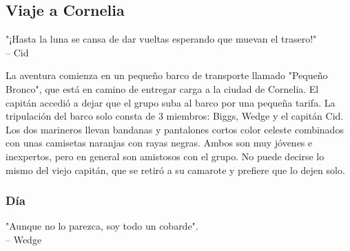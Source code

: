 \subsection*{Viaje a Cornelia}
"¡Hasta la luna se cansa de dar vueltas esperando que muevan el trasero!"\\
\indent-- Cid 
\begin{center} 
\end{center}
La aventura comienza en un pequeño barco de transporte llamado "Pequeño Bronco", que está en camino de entregar carga a la ciudad de Cornelia. El capitán accedió a dejar que el grupo suba al barco por una pequeña tarifa. La tripulación del barco solo consta de 3 miembros: Biggs, Wedge y el capitán Cid. Los dos marineros llevan bandanas y pantalones cortos color celeste combinados con unas camisetas naranjas con rayas negras. Ambos son muy jóvenes e inexpertos, pero en general son amistosos con el grupo. No puede decirse lo mismo del viejo capitán, que se retiró a su camarote y prefiere que lo dejen solo. \subsubsection*{Día} "Aunque no lo parezca, soy todo un cobarde".\\
\indent-- Wedge \\\\

